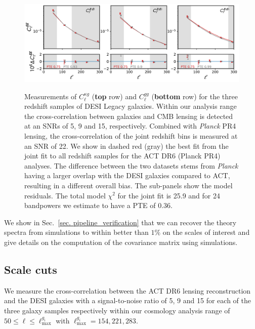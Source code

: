 \documentclass[twocolumn]{aastex631}
\begin{document}
{\begin{figure}
    \includegraphics[width=\linewidth]{figures/gg_best.pdf} \\ %
    \vspace{-8pt} %
    
    \caption{ Measurements of $C^{\kappa{g}}_\ell$ (\textbf{top} row) and  $C^{gg}_\ell$ (\textbf{bottom} row) for the three redshift samples of DESI Legacy galaxies. Within our analysis range the cross-correlation between galaxies and CMB lensing is detected at an SNRs  of 5, 9 and 15, respectively. Combined with \textit{Planck} PR4 lensing, the cross-correlation of the joint redshift bins is measured at an SNR of 22. We show in dashed red (gray) the best fit from the joint fit to all redshift samples for the ACT DR6 (Planck PR4) analyses. The difference between the two datasets stems from \textit{Planck} having a larger overlap with the DESI galaxies compared to ACT, resulting in a different overall bias. The sub-panels show the model residuals. The total model $\chi^2$ for the joint fit is 25.9 and for 24 bandpowers we estimate to have a PTE of 0.36.}
    \label{fig:bandpower}
\end{figure}


We show in Sec.~\ref{sec. pipeline_verification} that we can recover the theory spectra from simulations to within better than $1\%$ on the scales of interest and give details on the computation of the covariance matrix using simulations. 

\subsection{Scale cuts}
\label{sec: scale cuts}

We measure the cross-correlation between the ACT DR6 lensing reconstruction and the  DESI galaxies with a signal-to-noise ratio of 5, 9 and 15 for each of the three galaxy samples respectively within our cosmology analysis range of $50\leq\ell\leq\ell^{g_i}_\mathrm{max}$ with $\ell^{g_i}_\mathrm{max}=154,221,283$.

}
\end{document}
